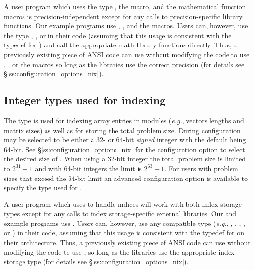 A user program which uses the type , the  macro, and the
 mathematical function macros is precision-independent except for any
calls to  precision-specific library functions. Our example programs use
, , and the  macros. Users can, however, use
the type , , or  in their code (assuming
that this usage is consistent with the typedef for ) and call the
appropriate math library functions directly. Thus, a previously existing piece
of ANSI {\CC} code can use {\sundials} without modifying the code to use
, , or the  macros so long as the {\sundials}
libraries use the correct precision (for details see
\S\ref{ss:configuration_options_nix}).


\subsection{Integer types used for indexing}

The type  is used for indexing array entries in {\sundials}
modules (\textit{e.g.}, vectors lengths and matrix sizes) as well as for storing
the total problem size. During configuration  may be selected
to be either a 32- or 64-bit \emph{signed} integer with the default being
64-bit. See \S\ref{ss:configuration_options_nix} for the configuration option
to select the desired size of . When using a 32-bit integer the
total problem size is limited to $2^{31}-1$ and with 64-bit integers the limit
is $2^{63}-1$. For users with problem sizes that exceed the 64-bit limit an
advanced configuration option is available to specify the type used for
.

A user program which uses  to handle indices will work with
both index storage types except for any calls to index storage-specific
external libraries. Our  and  example programs
use . Users can, however, use any compatible type
(\textit{e.g.}, , , , , or
) in their code, assuming that this usage is consistent with
the typedef for  on their architecture. Thus, a previously
existing piece of ANSI {\CC} code can use {\sundials} without modifying the code
to use , so long as the {\sundials} libraries use the
appropriate index storage type (for details see
\S\ref{ss:configuration_options_nix}).
